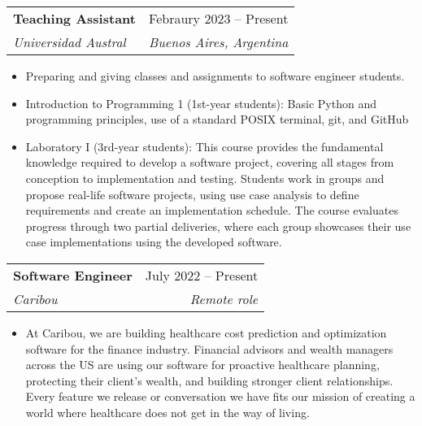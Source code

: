 \documentclass[letterpaper,11pt]{article}
\makeatletter
\newcommand{\resumeItem}[1]{
  \item\small{
    {#1 \vspace{-2pt}}
  }
}
\newcommand{\resumeSubheading}[4]{
  \vspace{-2pt}\item
    \begin{tabular*}{0.97\textwidth}[t]{l@{\extracolsep{\fill}}r}
      \textbf{#1} & #2 \\
      \textit{\small#3} & \textit{\small #4} \\
    \end{tabular*}\vspace{-7pt}
}
\newcommand{\resumeSubSubheading}[2]{
    \item
    \begin{tabular*}{0.97\textwidth}{l@{\extracolsep{\fill}}r}
      \textit{\small#1} & \textit{\small #2} \\
    \end{tabular*}\vspace{-7pt}
}
\newcommand{\resumeSubHeadingListEnd}{\end{itemize}}
\newcommand{\resumeItemListStart}{\begin{itemize}}
\newcommand{\resumeItemListEnd}{\end{itemize}\vspace{-5pt}}
\makeatother
\begin{document}
    \resumeSubheading
      {Teaching Assistant}{Febraury 2023 -- Present}
      {Universidad Austral}{Buenos Aires, Argentina}
      \resumeItemListStart
        \resumeItem{Preparing and giving classes and assignments to software engineer students.}
        \resumeItem{Introduction to Programming 1 (1st-year students): Basic Python and programming principles, use of a standard POSIX terminal, git, and GitHub}
        \resumeItem{Laboratory I (3rd-year students):
        This course provides the fundamental knowledge required to develop a software project, covering all stages from conception to implementation and testing. Students work in groups and propose real-life software projects, using use case analysis to define requirements and create an implementation schedule. The course evaluates progress through two partial deliveries, where each group showcases their use case implementations using the developed software.}
        \resumeItemListEnd
    \resumeSubheading
      {Software Engineer}{July 2022 -- Present}
      {Caribou}{Remote role}
      \resumeItemListStart
        \resumeItem{At Caribou, we are building healthcare cost prediction and optimization software for the finance industry. Financial advisors and wealth managers across the US are using our software for proactive healthcare planning, protecting their client’s wealth, and building stronger client relationships. Every feature we release or conversation we have fits our mission of creating a world where healthcare does not get in the way of living.}
      \resumeItemListEnd
      
\end{document}
